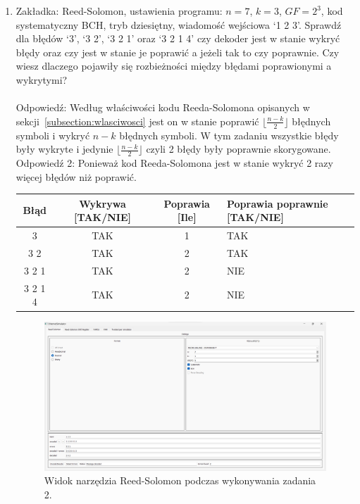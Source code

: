 \begin{enumerate}
    \item Zakładka: Reed-Solomon, ustawienia programu: $n = 7$, $k = 3$, $GF = 2^3$,
    kod systematyczny BCH, tryb dziesiętny, wiadomość wejściowa `1 2 3'.
    Sprawdź dla błędów `3', `3 2', `3 2 1' oraz `3 2 1 4' czy dekoder jest w stanie
    wykryć błędy oraz czy jest w stanie je poprawić a jeżeli tak to czy poprawnie.
    Czy wiesz dlaczego pojawiły się rozbieżności między błędami poprawionymi a wykrytymi? \\ \\
    Odpowiedź: Według właściwości kodu Reeda-Solomona opisanych w sekcji~\ref{subsection:wlasciwosci} jest on w stanie poprawić $\lfloor \frac{n-k}{2} \rfloor$ błędnych symboli i wykryć $n-k$ błędnych symboli.
    W tym zadaniu wszystkie błędy były wykryte i jedynie $\lfloor \frac{n-k}{2} \rfloor$ czyli 2 błędy były poprawnie skorygowane.
    Odpowiedź 2: Ponieważ kod Reeda-Solomona jest w stanie wykryć 2 razy więcej
    błędów niż poprawić.
    \begin{table}[H]
        \renewcommand{\arraystretch}{1.8}
        \centering
        \begin{tabular}{|c|c|c|>{\centering\arraybackslash}p{5cm}|}
            \hline
            \textbf{Błąd} & \textbf{Wykrywa [TAK/NIE]} & \textbf{Poprawia [Ile]} & \textbf{Poprawia poprawnie [TAK/NIE]} \\
            \hline
            3 & TAK & 1 & TAK \\
            \hline
            3 2 & TAK & 2 & TAK \\
            \hline
            3 2 1 & TAK & 2 & NIE \\
            \hline
            3 2 1 4 & TAK & 2 & NIE \\
            \hline
        \end{tabular}
    \end{table}

    \begin{figure}[H]
        \centering
        \includegraphics[width=\textwidth]{images/rozwiazania_2.png}
        \caption{Widok narzędzia Reed-Solomon podczas wykonywania zadania 2.}
        \label{fig:rozwiazania_2}
    \end{figure}
    

\end{enumerate}

